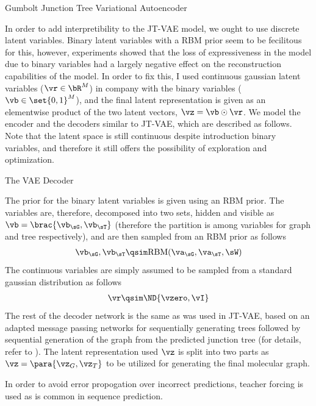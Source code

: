 \documentclass{article}
\begin{document}
\begin{psection}{Gumbolt Junction Tree Variational Autoencoder}

	In order to add interpretibility to the JT-VAE model, we ought to use discrete latent variables. Binary latent variables with a RBM prior seem to be fecilitous for this, however, experiments showed that the loss of expressiveness in the model due to binary variables had a largely negative effect on the reconstruction capabilities of the model. In order to fix this, I used continuous gaussian latent variables ($\vr \in \bR^{M}$) in company with the binary variables ($\vb \in \set{0, 1}^{M}$), and the final latent representation is given as an elementwise product of the two latent vectors, \ie $\vz = \vb \odot \vr$. We model the encoder and the decoders similar to JT-VAE, which are described as follows. Note that the latent space is still continuous despite introduction binary variables, and therefore it still offers the possibility of exploration and optimization.

	\begin{psubsection}{The VAE Decoder}

		The prior for the binary latent variables is given using an RBM prior. The variables are, therefore, decomposed into two sets, hidden and visible as $\vb = \brac{\vb_\sG, \vb_\sT}$ (therefore the partition is among variables for graph and tree respectively), and are then sampled from an RBM prior as follows
		\begin{align}
			\vb_\sG, \vb_\sT \qsim \text{RBM}(\va_\sG, \va_\sT, \sW)
			\label{eq:gvgcn-prior-binary}
		\end{align}
		The continuous variables are simply assumed to be sampled from a standard gaussian distribution as follows
		\begin{align}
			\vr \qsim \ND{\vzero, \vI}
			\label{eq:gvgcn-prior-binary}
		\end{align}
		The rest of the decoder network is the same as was used in JT-VAE, \ie based on an adapted message passing networks for sequentially generating trees followed by sequential generation of the graph from the predicted junction tree (for details, refer to \citep{jtvae}). The latent representation used $\vz$ is split into two parts as $\vz = \para{\vz_G, \vz_T}$ to be utilized for generating the final molecular graph.

		In order to avoid error propogation over incorrect predictions, teacher forcing is used as is common in sequence prediction.


\end{psubsection}
\end{psection}
\end{document}
